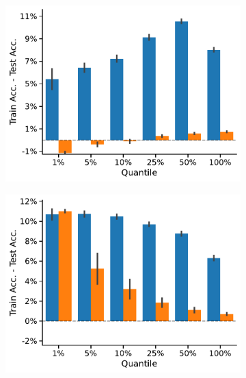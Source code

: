 \begin{figure}[htb]
\begin{subfigure}[b]{0.3\textwidth}
		\centering
		\includegraphics[width=\textwidth]{Figures/train_test_diff_MUTAG.pdf}
		\vspace*{-4ex} 
		\caption{\mutag}
	\end{subfigure}
	\par\bigskip
	\begin{subfigure}[b]{0.3\textwidth}
		\centering
		\includegraphics[width=\textwidth]{Figures/train_test_diff_NCI1.pdf}
		\vspace*{-4ex} 
		\caption{\nci}
	\end{subfigure}
	\hfill
	\begin{subfigure}[b]{0.3\textwidth}
		\centering

\end{subfigure}
\end{figure}
